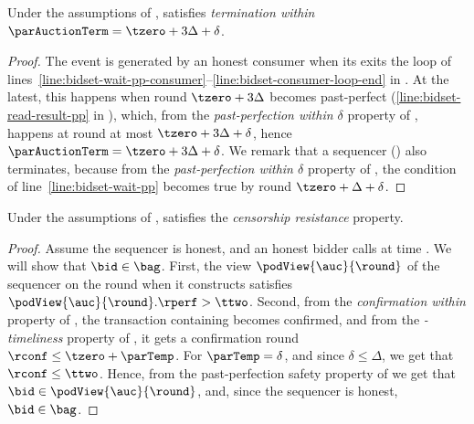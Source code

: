 \begin{lemma}\label{lem:bidset-termination}
    Under the assumptions of ,  satisfies \emph{termination within $\parAuctionTerm = \tzero + 3\Delta + \delta$}.
\end{lemma}
\begin{proof}
    The \opResult{} event is generated by an honest consumer when its exits the loop of lines~\ref{line:bidset-wait-pp-consumer}--\ref{line:bidset-consumer-loop-end} in . At the latest, this happens when round $\tzero + 3\Delta$ becomes past-perfect (\cref{line:bidset-read-result-pp} in ), which, from the \emph{past-perfection within $\delta$} property of \podtm, happens at round at most $\tzero + 3\Delta + \delta$, hence $\parAuctionTerm = \tzero + 3\Delta + \delta$.
    We remark that a sequencer () also terminates, because from the \emph{past-perfection within $\delta$} property of \podtm, the condition of line~\ref{line:bidset-wait-pp} becomes true by round $\tzero + \Delta + \delta$.
\end{proof}

\begin{lemma}\label{lem:bidset-censorship}
    Under the assumptions of ,  satisfies the \emph{censorship resistance} property.
\end{lemma}
\begin{proof}
    Assume the sequencer is honest, and an honest bidder calls \opSubmitBid{\bid} at time \tzero. We will show that $\bid \in \bag$.
    First, the \podtm view $\podView{\auc}{\round}$ of the sequencer \auc on the round \round when it constructs \bag satisfies $\podView{\auc}{\round}.\rperf > \ttwo$.
    Second, from the \emph{confirmation within \parConf} property of \podtm, the transaction containing \bid becomes confirmed, and from the \emph{\parTemp-timeliness} property of \podtm, it gets a confirmation round $\rconf \leq \tzero + \parTemp$. For $\parTemp = \delta$, and since $\delta \leq \Delta$, we get that $\rconf \leq \ttwo$.
    Hence, from the past-perfection safety property of \podtm we get that $\bid \in \podView{\auc}{\round}$, and, since the sequencer is honest, $\bid \in \bag$.
\end{proof}

